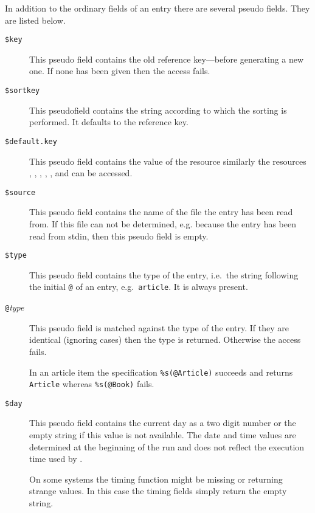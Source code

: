 \documentclass[11pt,a4paper]{scrbook}
\begin{document}
In addition to the ordinary fields of an entry there are several
pseudo fields. They are listed below.

\begin{description}
\item [\texttt{\$key}]\label{pseudo:key}%
  This pseudo field contains the old reference key---before generating a new
  one. If none has been given then the access fails.

\item [\texttt{\$sortkey}]%
  This pseudofield contains the string according to which the sorting is
  performed. It defaults to the reference key.

\item [\texttt{\$default.key}]%
  This pseudo field contains the value of the resource 
  similarly the resources , ,
  , , , and
   can be accessed.

\item [\texttt{\$source}]%
  This pseudo field contains the name of the file the entry has been read
  from. If this file can not be determined, e.g. because the entry has been
  read from stdin, then this pseudo field is empty.

\item [\texttt{\$type}]%
  This pseudo field contains the type of the entry, i.e.\ the string following
  the initial \texttt{@} of an \BibTeX{} entry, e.g.\ \texttt{article}. It is
  always present.

\item [\texttt{@}\textit{type}]%
  This pseudo field is matched against the type of the entry. If they are
  identical (ignoring cases) then the type is returned. Otherwise the access
  fails.
  
  In an article item the specification \texttt{\%s(@Article)}
  succeeds and returns \texttt{Article} whereas
  \texttt{\%s(@Book)} fails.

\item [\texttt{\$day}]%
  This pseudo field contains the current day as a two digit number or the
  empty string if this value is not available. The date and time values are
  determined at the beginning of the \BibTool{} run and does not reflect the
  execution time used by \BibTool.

  On some systems the timing function might be missing or returning strange
  values. In this case the timing fields simply return the empty string. 


\end{description}
\end{document}
